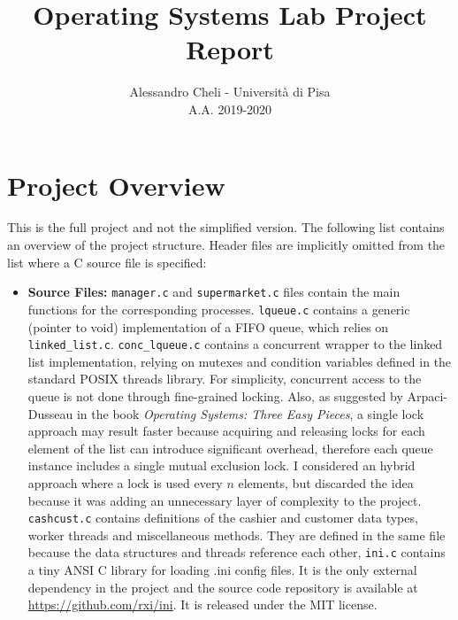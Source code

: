 \documentclass{article}
\title{Operating Systems Lab Project Report}
\author{Alessandro Cheli - Università di Pisa\\ A.A. 2019-2020}
\begin{document}
    \maketitle

    \section{Project Overview}
    This is the full project and not the simplified version.  The following
    list contains an overview of the project structure. Header files are
    implicitly omitted from the list where a C source file is specified:
    \begin{itemize}
        \item \textbf{Source Files:} \texttt{manager.c} and \texttt{supermarket.c} files contain the main
        functions for the corresponding processes. 
        \texttt{lqueue.c} contains a generic (pointer to void) implementation
        of a FIFO queue, which relies on \texttt{linked\_list.c}.
        \texttt{conc\_lqueue.c} contains a concurrent wrapper to the linked
        list implementation, relying on mutexes and condition variables defined
        in the standard POSIX threads library.
        For simplicity, concurrent access to the queue is not done through fine-grained
        locking. Also, as suggested by Arpaci-Dusseau in the book
        \textit{Operating Systems: Three Easy Pieces}, a single lock approach
        may result faster because acquiring and releasing locks for each element of
        the list can introduce significant overhead, therefore each queue
        instance includes a single mutual exclusion lock. I considered an hybrid
        approach where a lock is used every $n$ elements, but discarded the idea
        because it was adding an unnecessary layer of complexity to the project.
        \texttt{cashcust.c} contains definitions of the cashier and customer
        data types, worker threads and miscellaneous methods. They are defined in the
        same file because the data structures and threads reference each other,
        \texttt{ini.c} contains a tiny ANSI C library for loading .ini
        config files. It is the only external dependency in the project and
        the source code repository is available at \url{https://github.com/rxi/ini}.
        It is released under the MIT license.


\end{itemize}
\end{document}
